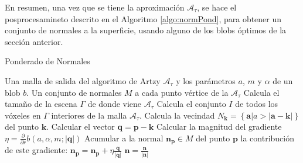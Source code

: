 En resumen, una vez que se tiene la aproximación $\mathcal{A}_{\tau}$, se hace el posprocesamineto descrito en el Algoritmo \ref{algo:normPond}, para obtener un conjunto de normales a la superficie, usando alguno de los blobs óptimos de la sección anterior.

\begin{algorithm}[H]
\caption{Ponderado de Normales}
\label{algo:normPond}
\begin{algorithmic}[1]
\REQUIRE Una malla de salida del algoritmo de Artzy $\mathcal{A}_{\tau}$ y los parámetros $a$, $m$ y $\alpha$ de un blob $b$.
\ENSURE Un conjunto de normales $M$ a cada punto vértice de la $\mathcal{A}_{\tau}$
\STATE Calcula el tamaño de la escena $\Gamma$ de donde viene $\mathcal{A}_{\tau}$ 
\STATE Calcula el conjunto $I$ de todos los vóxeles en $\Gamma$ interiores de la malla $\mathcal{A}_{\tau}$.
     \STATE Calcula la vecindad $N_{\textbf{k}} = \left\lbrace \textbf{a} | a > |\textbf{a} - \textbf{k}| \right\rbrace $ del punto $\textbf{k}$.     
	   \STATE Calcular el vector $\textbf{q} = \textbf{p} - \textbf{k}$
	   \STATE Calcular la magnitud del gradiente $\eta = \frac{\partial}{\partial r} b (a, \alpha, m; |\textbf{q}| )$
	   \STATE Acumular a la normal $\textbf{n}_{\textbf{p}} \in M$ del punto $\textbf{p}$ la contribución de este gradiente: $\textbf{n}_{\textbf{p}} = \textbf{n}_{\textbf{p}} + \eta\frac{\textbf{q}}{|\textbf{q}|}$
	\ENDIF
     \ENDFOR
   \ENDIF
\ENDFOR
{}
  \STATE $\textbf{n} = \frac{\textbf{n}}{|\textbf{n}|}$
\ENDFOR
\end{algorithmic}
\end{algorithm}
